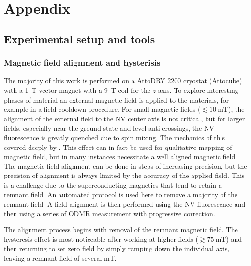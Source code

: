 \chapter{Appendix}\label{sec:appendix}

\section{Experimental setup and tools}

\subsection{Magnetic field alignment and hysterisis}
The majority of this work is performed on a AttoDRY 2200 cryostat (Attocube) with a \qty{1}{\tesla} vector magnet with a \qty{9}{\tesla} coil for the $z$-axis. To explore interesting phases of material an external magnetic field is applied to the materials, for example in a field cooldown procedure. For small magnetic fields ($\lesssim\qty{10}{\milli\tesla}$), the alignment of the external field to the \gls{NV} center axis is not critical, but for larger fields, especially near the ground state and  level anti-crossings, the \gls{NV} fluorescence is greatly quenched due to spin mixing. The mechanics of this covered deeply by \citeauthor*{tetienneMagneticfielddependentPhotodynamicsSingle2012}\cite{tetienneMagneticfielddependentPhotodynamicsSingle2012}. This effect can in fact be used for qualitative mapping of magnetic field, but in many instances necessitate a well aligned magnetic field. The magnetic field alignment can be done in steps of increasing precision, but the precision of alignment is always limited by the accuracy of the applied field. This is a challenge due to the superconducting magnetics that tend to retain a remnant field. An automated protocol is used here to remove a majority of the remnant field. A field alignment is then performed using the \gls{NV} fluorescence and then using a series of \gls{ODMR} measurement with progressive correction.

The alignment process begins with removal of the remnant magnetic field. The hysteresis effect is most noticeable after working at higher fields ($\gtrsim\qty{75}{\milli\tesla}$) and then returning to set zero field by simply ramping down the individual axis, leaving a remnant field of several \unit{\milli\tesla}.


